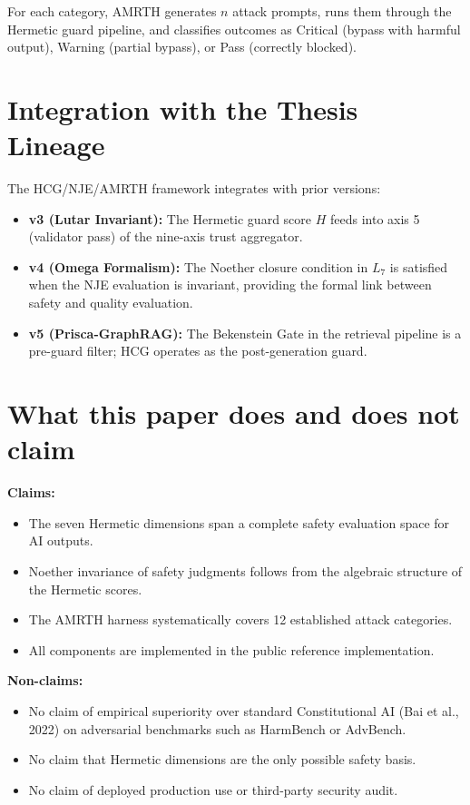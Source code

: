 \documentclass[11pt]{article}
\theoremstyle{plain}
\begin{document}
For each category, AMRTH generates \( n \) attack prompts, runs them through the Hermetic guard pipeline, and classifies outcomes as Critical (bypass with harmful output), Warning (partial bypass), or Pass (correctly blocked).


\section{Integration with the Thesis Lineage}

The HCG/NJE/AMRTH framework integrates with prior versions:

\begin{itemize}
  \item \textbf{v3 (Lutar Invariant):} The Hermetic guard score \( H \) feeds into axis 5 (validator pass) of the nine-axis trust aggregator.
  \item \textbf{v4 (Omega Formalism):} The Noether closure condition in \( L_7 \) is satisfied when the NJE evaluation is invariant, providing the formal link between safety and quality evaluation.
  \item \textbf{v5 (Prisca-GraphRAG):} The Bekenstein Gate in the retrieval pipeline is a pre-guard filter; HCG operates as the post-generation guard.
\end{itemize}


\section{What this paper does and does not claim}

\textbf{Claims:}
\begin{itemize}
  \item The seven Hermetic dimensions span a complete safety evaluation space for AI outputs.
  \item Noether invariance of safety judgments follows from the algebraic structure of the Hermetic scores.
  \item The AMRTH harness systematically covers 12 established attack categories.
  \item All components are implemented in the public reference implementation.
\end{itemize}

\textbf{Non-claims:}
\begin{itemize}
  \item No claim of empirical superiority over standard Constitutional AI (Bai et al., 2022) on adversarial benchmarks such as HarmBench or AdvBench.
  \item No claim that Hermetic dimensions are the only possible safety basis.
  \item No claim of deployed production use or third-party security audit.
\end{itemize}
\end{document}
